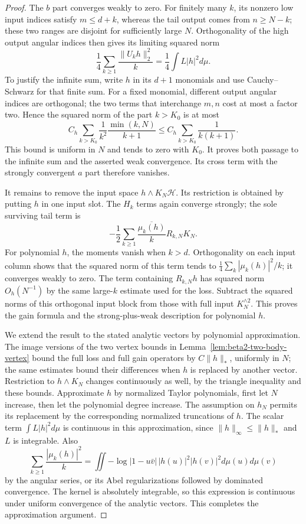 \documentclass[11pt,a4paper]{article}
\numberwithin{equation}{section}
\theoremstyle{definition}
\theoremstyle{remark}
\begin{document}
\begin{proof}
The $b$ part converges weakly to zero.  For finitely many $k$,
its nonzero low input indices satisfy $m\le d+k$, whereas the
tail output comes from $n\ge N-k$; these two ranges are disjoint
for sufficiently large $N$.  Orthogonality of the high output
angular indices then gives its limiting squared norm
\[
 \frac14\sum_{k\ge1}\frac{\|U_kh\|_2^2}{k}
       =\frac14\int L|h|^2d\mu.
\]
To justify the infinite sum, write $h$ in its $d+1$ monomials and
use Cauchy--Schwarz for that finite sum.  For a fixed monomial,
different output angular indices are orthogonal; the two terms
that interchange $m,n$ cost at most a factor two.  Hence the
squared norm of the part $k>K_0$ is at most
\[
 C_h\sum_{k>K_0}\frac{1}{k^2}
                 \frac{\min(k,N)}{k+1}
 \le C_h\sum_{k>K_0}\frac1{k(k+1)}.
\]
This bound is uniform in $N$ and tends to zero with $K_0$.
It proves both passage to the infinite sum and the asserted weak
convergence.  Its cross term with the strongly convergent $a$ part
therefore vanishes.

It remains to remove the input space $h\wedge K_N\mathcal H$.
Its restriction is obtained by putting $h$ in one input slot.
The $H_k$ terms again converge strongly; the sole surviving tail
term is
\[
 -\frac12\sum_{k\ge1}\frac{\overline{\mu_k(h)}}{k}R_{k,N}K_N.
\]
For polynomial $h$, the moments vanish when $k>d$.  Orthogonality
on each input column shows that the squared norm of this term tends
to $\tfrac14\sum_k|\mu_k(h)|^2/k$; it converges weakly to zero.
The term containing $R_{k,N}h$ has squared norm $O_h(N^{-1})$
by the same large-$k$ estimate used for the loss.  Subtract the
squared norms of this orthogonal input block from those with full
input $K_N^{\wedge2}$.  This proves the gain formula and the
strong-plus-weak description for polynomial $h$.

We extend the result to the stated analytic vectors by polynomial
approximation.  The image versions of the two vertex bounds in
Lemma~\ref{lem:beta2-two-body-vertex} bound the full loss and full
gain operators by $C\|h\|_*$, uniformly in $N$; the same estimates
bound their differences when $h$ is replaced by another vector.
Restriction to $h\wedge K_N$ changes continuously as well, by
the triangle inequality and these bounds.  Approximate $h$ by
normalized Taylor polynomials, first let $N$ increase, then let
the polynomial degree increase.  The assumption on $h_N$ permits
its replacement by the corresponding normalized truncations of
$h$.  The scalar term $\int L|h|^2d\mu$ is continuous in this
approximation, since $\|h\|_\infty\le\|h\|_*$ and $L$ is
integrable.  Also
\[
 \sum_{k\ge1}\frac{|\mu_k(h)|^2}{k}
 =\iint -\log|1-u\bar v|\,|h(u)|^2|h(v)|^2
                                    d\mu(u)d\mu(v)
\]
by the angular series, or its Abel regularizations followed by
dominated convergence.  The kernel is absolutely integrable,
so this expression is continuous under uniform convergence of
the analytic vectors.  This completes the approximation argument.


\end{proof}
\end{document}
